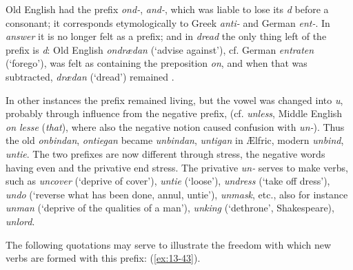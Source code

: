 \label{privative_un}

Old English had the prefix \textit{ond-}, \textit{and-}, which was liable to lose its \textit{d} before a consonant; it corresponds etymologically to Greek \textit{anti-} and German \textit{ent-}. In \textit{answer} it is no longer felt as a prefix; and in \textit{dread} the only thing left of the prefix is \textit{d}: Old English \textit{ondrædan} (`advise against'), cf. German \textit{entraten} (`forego'), was felt as containing the preposition \textit{on}, and when that was subtracted, \textit{drædan} (`dread') remained \citep[182]{pogatscher1903fieldfare}.

In other instances the prefix remained living, but the vowel was changed into \textit{u}, probably through influence from the negative prefix, (cf. \textit{unless}, 
Middle English \textit{on lesse} (\textit{that}), where also the negative notion caused confusion with \textit{un-}). Thus the old 
\textit{onbindan}, \textit{ontiegan} became \textit{unbindan}, \textit{untigan} in Ælfric, modern \textit{unbind}, \textit{untie}. The two prefixes are now different through stress, the negative words having even and the privative end stress. The privative \textit{un-} serves to make verbs, such as \textit{uncover} (`deprive of cover'), \textit{untie} (`loose'), %
\textit{undress} (`take off dress'), \textit{undo} (`reverse what has been done, annul, untie'), \textit{unmask}, etc., also for instance \mbox{\textit{unman}} (`deprive of the qualities of a man'), \textit{unking} (`dethrone', Shakespeare), \textit{unlord}.

The following quotations may serve to illustrate the freedom with which new verbs are formed with this prefix: (\ref{ex:13-43}).

